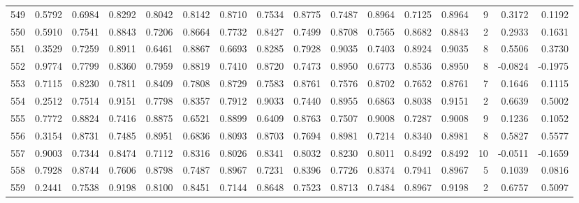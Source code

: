 \begin{tabular}{lrrrrrrrrrrrrrrr}
549 &      0.5792 &  0.6984 &  0.8292 &  0.8042 &  0.8142 &  0.8710 &  0.7534 &  0.8775 &  0.7487 &  0.8964 &   0.7125 &     0.8964 &      9 &                    0.3172 &                     0.1192 \\
550 &      0.5910 &  0.7541 &  0.8843 &  0.7206 &  0.8664 &  0.7732 &  0.8427 &  0.7499 &  0.8708 &  0.7565 &   0.8682 &     0.8843 &      2 &                    0.2933 &                     0.1631 \\
551 &      0.3529 &  0.7259 &  0.8911 &  0.6461 &  0.8867 &  0.6693 &  0.8285 &  0.7928 &  0.9035 &  0.7403 &   0.8924 &     0.9035 &      8 &                    0.5506 &                     0.3730 \\
552 &      0.9774 &  0.7799 &  0.8360 &  0.7959 &  0.8819 &  0.7410 &  0.8720 &  0.7473 &  0.8950 &  0.6773 &   0.8536 &     0.8950 &      8 &                   -0.0824 &                    -0.1975 \\
553 &      0.7115 &  0.8230 &  0.7811 &  0.8409 &  0.7808 &  0.8729 &  0.7583 &  0.8761 &  0.7576 &  0.8702 &   0.7652 &     0.8761 &      7 &                    0.1646 &                     0.1115 \\
554 &      0.2512 &  0.7514 &  0.9151 &  0.7798 &  0.8357 &  0.7912 &  0.9033 &  0.7440 &  0.8955 &  0.6863 &   0.8038 &     0.9151 &      2 &                    0.6639 &                     0.5002 \\
555 &      0.7772 &  0.8824 &  0.7416 &  0.8875 &  0.6521 &  0.8899 &  0.6409 &  0.8763 &  0.7507 &  0.9008 &   0.7287 &     0.9008 &      9 &                    0.1236 &                     0.1052 \\
556 &      0.3154 &  0.8731 &  0.7485 &  0.8951 &  0.6836 &  0.8093 &  0.8703 &  0.7694 &  0.8981 &  0.7214 &   0.8340 &     0.8981 &      8 &                    0.5827 &                     0.5577 \\
557 &      0.9003 &  0.7344 &  0.8474 &  0.7112 &  0.8316 &  0.8026 &  0.8341 &  0.8032 &  0.8230 &  0.8011 &   0.8492 &     0.8492 &     10 &                   -0.0511 &                    -0.1659 \\
558 &      0.7928 &  0.8744 &  0.7606 &  0.8798 &  0.7487 &  0.8967 &  0.7231 &  0.8396 &  0.7726 &  0.8374 &   0.7941 &     0.8967 &      5 &                    0.1039 &                     0.0816 \\
559 &      0.2441 &  0.7538 &  0.9198 &  0.8100 &  0.8451 &  0.7144 &  0.8648 &  0.7523 &  0.8713 &  0.7484 &   0.8967 &     0.9198 &      2 &                    0.6757 &                     0.5097 \\

\end{tabular}
